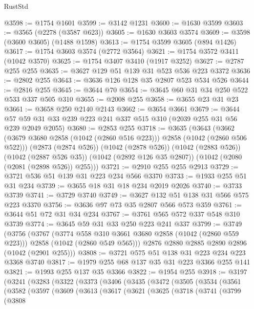 \begin{lexlean}{RustStd}
\begin{coremodule}
@3598 := @1754 @1601
@3599 := @3142 @1231
@3600 := @1630 @3599
@3603 := @3565 (@2278 (@3587 @623))
@3605 := @1630 @3603 @3574
@3609 := @3598 (@3600 @3605) (@1488 @1598)
@3613 := @1754 @3599 @3605 (@894 @1426)
@3617 := @1754 @3603 @3574 (@2772 @3564)
@3621 := @1754 @3572 @3411 (@1042 @3570)
@3625 := @1754 @3407 @3410 (@1917 @3252)
@3627 := @2787 @255 @255
@3635 := @3627 @129 @51 @139 @31 @523 @536 @223 @3372
@3636 := @2802 @255
@3643 := @3636 @126 @128 @35 @2807 @523 @534 @526
@3644 := @2816 @255
@3645 := @3644 @70
@3654 := @3645 @60 @31 @34 @250 @522 @533 @337 @505 @310
@3655 := @2008 @255
@3658 := @3655 @23 @31 @23
@3661 := @3658 @250 @2140 @2143
@3662 := @3654 @3661
@3679 := @3644 @57 @59 @31 @33 @239 @223 @241 @337 @515 @310 (@2039 @255 @31 @56 @239 @2049 @2055)
@3680 := @2853 @255
@3718 := @3635
    (@3643
      (@3662 (@3679 @3680 @2858 (@1042 (@2860 @516 @223))) @2858 (@1042 (@2860 @506 @522)))
      (@2873 (@2874 @526))
      (@1042 (@2878 @526))
      (@1042 (@2883 @526))
      (@1042 (@2887 @526 @35))
      (@1042 (@2892 @126 @35 @2807))
      (@1042 (@2080 (@2081 (@2898 @526)) @255)))
@3721 := @2910 @255 @255 @2913
@3729 := @3721 @536 @51 @139 @31 @223 @234 @566 @3370
@3733 := @1933 @255 @51 @31 @234
@3739 := @3655 @18 @31 @18 @234 @2019 @2026
@3740 := @3733 @3739
@3741 := @3729 @3740
@3749 := @3627 @132 @51 @138 @31 @566 @575 @223 @3370
@3756 := @3636 @97 @73 @35 @2807 @566 @573 @359
@3761 := @3644 @51 @72 @31 @34 @234
@3767 := @3761 @565 @572 @337 @548 @310 @3739
@3774 := @3645 @59 @31 @33 @250 @223 @241 @337
@3799 := @3749
    (@3756
      (@3767
        (@3774 @558 @310 @3661 @3680 @2858 (@1042 (@2860 @559 @223)))
        @2858
        (@1042 (@2860 @549 @565)))
      @2876
      @2880
      @2885
      @2890
      @2896
      (@1042 (@2901 @255)))
@3808 := @3721 @575 @51 @138 @31 @223 @234 @223 @3368 @3740
@3817 := @1979 @255 @68 @137 @35 @31 @223 @3366 @255 @141
@3821 := @1993 @255 @137 @35 @3366
@3822 := @1954 @255
@3918 := @3197
    (@3241
      (@3283
        (@3322
          (@3373
            (@3406
              (@3435
                (@3472
                  (@3505
                    (@3534
                      (@3561
                        (@3582
                          (@3597
                            (@3609
                              (@3613
                                (@3617
                                  (@3621
                                    (@3625
                                      (@3718
                                        (@3741
                                          (@3799
                                            (@3808

\end{coremodule}
\end{lexlean}
